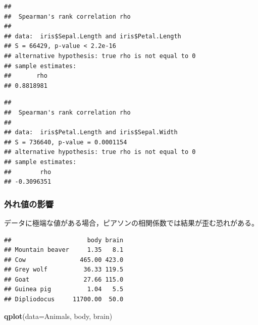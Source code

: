 \documentclass[]{article}
\newenvironment{Shaded}{\begin{snugshade}}{\end{snugshade}}
\newcommand{\KeywordTok}[1]{\textcolor[rgb]{0.13,0.29,0.53}{\textbf{#1}}}
\newcommand{\DataTypeTok}[1]{\textcolor[rgb]{0.13,0.29,0.53}{#1}}
\newcommand{\StringTok}[1]{\textcolor[rgb]{0.31,0.60,0.02}{#1}}
\newcommand{\CommentTok}[1]{\textcolor[rgb]{0.56,0.35,0.01}{\textit{#1}}}
\newcommand{\OperatorTok}[1]{\textcolor[rgb]{0.81,0.36,0.00}{\textbf{#1}}}
\newcommand{\NormalTok}[1]{#1}
\begin{document}
\begin{verbatim}
## 
##  Spearman's rank correlation rho
## 
## data:  iris$Sepal.Length and iris$Petal.Length
## S = 66429, p-value < 2.2e-16
## alternative hypothesis: true rho is not equal to 0
## sample estimates:
##       rho 
## 0.8818981
\end{verbatim}

\begin{Shaded}
\end{Shaded}

\begin{verbatim}
## 
##  Spearman's rank correlation rho
## 
## data:  iris$Petal.Length and iris$Sepal.Width
## S = 736640, p-value = 0.0001154
## alternative hypothesis: true rho is not equal to 0
## sample estimates:
##        rho 
## -0.3096351
\end{verbatim}

\subsubsection{外れ値の影響}

データに極端な値がある場合，ピアソンの相関係数では結果が歪む恐れがある。

\begin{Shaded}
\end{Shaded}

\begin{verbatim}
##                     body brain
## Mountain beaver     1.35   8.1
## Cow               465.00 423.0
## Grey wolf          36.33 119.5
## Goat               27.66 115.0
## Guinea pig          1.04   5.5
## Dipliodocus     11700.00  50.0
\end{verbatim}

\begin{Shaded}
\begin{Highlighting}[]
\KeywordTok{qplot}\NormalTok{(}\DataTypeTok{data=}\NormalTok{Animals, body, brain)}
\end{Highlighting}
\end{Shaded}
\end{document}

